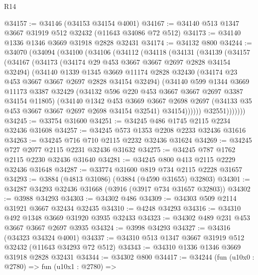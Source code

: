 \begin{lexlean}{R14}
\begin{coremodule}
@34157 := @34146 (@34153 @34154 @4001)
@34167 := @34140 @513 @1347 @3667 @31919 @512 @32432 (@11643 @34086 @72 @512)
@34173 := @34140 @1336 @1346 @3669 @31918 @2828 @32431
@34174 := @34132 @800
@34244 := @34070
    (@34094
      (@34100
        (@34106
          (@34112
            (@34118
              (@34131
                (@34139
                  (@34157
                    (@34167
                      (@34173
                        (@34174 @29 @453 @3667 @3667 @2697 @2828 @34154 @32494)
                        (@34140
                          @1339
                          @1345
                          @3669
                          @11174
                          @2828
                          @32430
                          (@34174 @23 @453 @3667 @3667 @2697 @2828 @34154 @32494)
                          (@34140
                            @599
                            @1344
                            @3669
                            @11173
                            @3387
                            @32429
                            (@34132 @596 @220 @453 @3667 @3667 @2697 @3387 @34154 @11805)
                            (@34140
                              @1342
                              @453
                              @3669
                              @3667
                              @2698
                              @2697
                              (@34133 @35 @453 @3667 @3667 @2697 @2698 @34154 @32541)
                              @34154))))))
                  @32551)))))))
@34245 := @33754 @31600
@34251 := @34245 @486 @1745 @2115 @2234 @32436 @31608
@34257 := @34245 @573 @1353 @2208 @2233 @32436 @31616
@34263 := @34245 @716 @710 @2115 @2232 @32436 @31624
@34269 := @34245 @727 @2077 @2115 @2231 @32436 @31632
@34275 := @34245 @787 @1762 @2115 @2230 @32436 @31640
@34281 := @34245 @800 @413 @2115 @2229 @32436 @31648
@34287 := @33774 @31600 @819 @734 @2115 @2228 @31657
@34293 := @3884 (@4813 @31086) (@3884 (@4590 @31655) @32803)
@34301 := @34287 @34293 @32436 @31668 (@3916 (@3917 @734 @31657 @32803))
@34302 := @3988 @34293
@34303 := @34302 @486
@34309 := @34303 @509 @2114 @31921 @3667 @32434 @32435
@34310 := @4248 @34293
@34316 := @34310 @492 @1348 @3669 @31920 @3935 @32433
@34323 := @34302 @489 @231 @453 @3667 @3667 @2697 @3935
@34324 := @3998 @34293
@34327 := @34316 (@34323 @34324 @4001)
@34337 := @34310 @513 @1347 @3667 @31919 @512 @32432 (@11643 @34293 @72 @512)
@34343 := @34310 @1336 @1346 @3669 @31918 @2828 @32431
@34344 := @34302 @800
@34417 := @34244
    (fun (u10x0 : @2780) =>
    fun (u10x1 : @2780) =>

\end{coremodule}
\end{lexlean}
